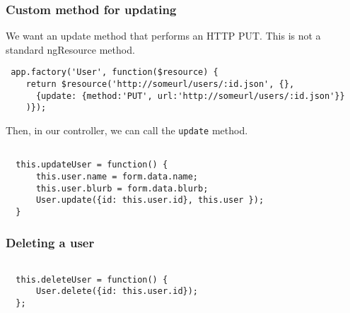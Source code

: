 \documentclass[10pt]{beamer}
\begin{document}
\begin{frame}[fragile]
  \frametitle{Custom method for updating}

  We want an update method that performs an HTTP PUT.  This is 
  not a standard ngResource method.
 
 \begin{verbatim}
 app.factory('User', function($resource) {
    return $resource('http://someurl/users/:id.json', {},
      {update: {method:'PUT', url:'http://someurl/users/:id.json'}}
    )});
 \end{verbatim}

 Then, in our controller, we can call the \texttt{update} method.

 \begin{verbatim}

  this.updateUser = function() {
      this.user.name = form.data.name;
      this.user.blurb = form.data.blurb;
      User.update({id: this.user.id}, this.user });
  } 
 \end{verbatim}
\end{frame}



\begin{frame}[fragile]
  \frametitle{Deleting a user}

 \begin{verbatim}
 
  this.deleteUser = function() {
      User.delete({id: this.user.id});
  };
 \end{verbatim}

\end{frame}
\end{document}
